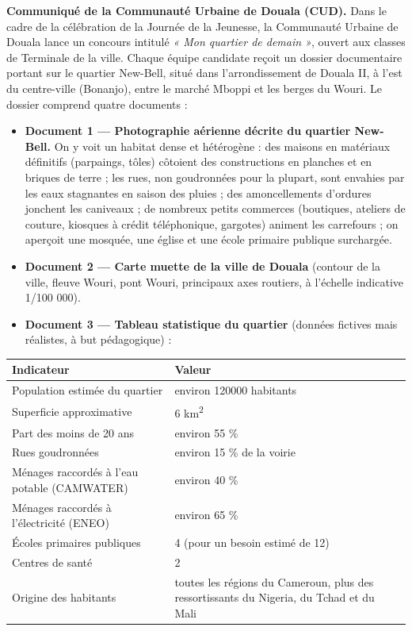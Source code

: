 \documentclass[11pt]{article}
\newcommand{\cle}[1]{{\popxbold\color{popdark}#1}}
\newcounter{popsec}
\newcounter{popsub}
\newcommand{\courssub}[1]{%
  \stepcounter{popsub}%
  \par\vspace{9pt}\noindent{\popxbold\fontsize{11.5}{13}\selectfont\color{popink}{\color{poporange}\thepopsec.\thepopsub}\hspace{6pt}#1}\par\nopagebreak\vspace{4pt}
}
\begin{document}
\courssub{Situation}

\textbf{Communiqué de la Communauté Urbaine de Douala (CUD).} Dans le cadre de la célébration de la Journée de la Jeunesse, la Communauté Urbaine de Douala lance un concours intitulé \emph{« Mon quartier de demain »}, ouvert aux classes de Terminale de la ville. Chaque équipe candidate reçoit un dossier documentaire portant sur le quartier \cle{New-Bell}, situé dans l'arrondissement de Douala II, à l'est du centre-ville (Bonanjo), entre le marché Mboppi et les berges du Wouri. Le dossier comprend quatre documents :

\begin{itemize}
\item \textbf{Document 1 — Photographie aérienne décrite du quartier New-Bell.} On y voit un habitat dense et hétérogène : des maisons en matériaux définitifs (parpaings, tôles) côtoient des constructions en planches et en briques de terre ; les rues, non goudronnées pour la plupart, sont envahies par les eaux stagnantes en saison des pluies ; des amoncellements d'ordures jonchent les caniveaux ; de nombreux petits commerces (boutiques, ateliers de couture, kiosques à crédit téléphonique, gargotes) animent les carrefours ; on aperçoit une mosquée, une église et une école primaire publique surchargée.
\item \textbf{Document 2 — Carte muette de la ville de Douala} (contour de la ville, fleuve Wouri, pont Wouri, principaux axes routiers, à l'échelle indicative 1/100 000).
\item \textbf{Document 3 — Tableau statistique du quartier} (données fictives mais réalistes, à but pédagogique) :
\end{itemize}

\begin{center}
\begin{tabularx}{\linewidth}{|l|X|}\hline
\rowcolor{popblueL} \textbf{Indicateur} & \textbf{Valeur} \\ \hline
Population estimée du quartier & environ \num{120000} habitants \\ \hline
Superficie approximative & 6 km\textsuperscript{2} \\ \hline
Part des moins de 20 ans & environ 55 \% \\ \hline
Rues goudronnées & environ 15 \% de la voirie \\ \hline
Ménages raccordés à l'eau potable (CAMWATER) & environ 40 \% \\ \hline
Ménages raccordés à l'électricité (ENEO) & environ 65 \% \\ \hline
Écoles primaires publiques & 4 (pour un besoin estimé de 12) \\ \hline
Centres de santé & 2 \\ \hline
Origine des habitants & toutes les régions du Cameroun, plus des ressortissants du Nigeria, du Tchad et du Mali \\ \hline
\end{tabularx}
\end{center}
\end{document}
